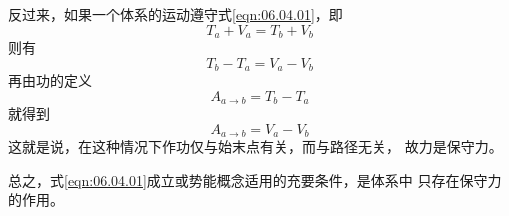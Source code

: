 \clearpage
反过来，如果一个体系的运动遵守式\eqref{eqn:06.04.01}，即
\begin{equation*}
    T _ { a } + V _ { a } = T _ { b } + V _ { b }
\end{equation*}
则有
\begin{equation*}
    T _ { b } - T _ { a } = V _ { a } - V _ { b }
\end{equation*}
再由功的定义
\begin{equation*}
    A _ { a \to b } = T _ { b } - T _ { a }
\end{equation*}
就得到
\begin{equation*}
    A _ { a \to b } = V _ { a } - V _ { b }
\end{equation*}
这就是说，在这种情况下作功仅与始末点有关，而与路径无关，
故力是保守力。

总之，式\eqref{eqn:06.04.01}成立或势能概念适用的充要条件，是体系中
只存在保守力的作用。